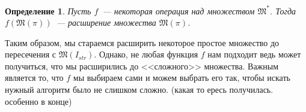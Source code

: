 \documentclass[a4paper, 12pt]{report}
\newtheorem*{definition}{Определение}
\begin{document}
\begin{definition} 
Пусть $f$~--- некоторая операция над множеством $\mathfrak{M}^*$. Тогда $f(\mathfrak{M}(\pi))$~--- расширение множества $\mathfrak{M}(\pi)$. 
\end{definition}

Таким образом, мы стараемся расширить некоторое простое множество до пересечения с $\mathfrak{M}(I_{str})$. Однако, не любая функция $f$ нам подходит ведь может получиться, что мы расширились до <<сложного>> множества. Важным является то, что $f$ мы выбираем сами и можем выбрать его так, чтобы искать нужный алгоритм было не слишком сложно. (какая то ересь получилась. особенно в конце)
\end{document}
